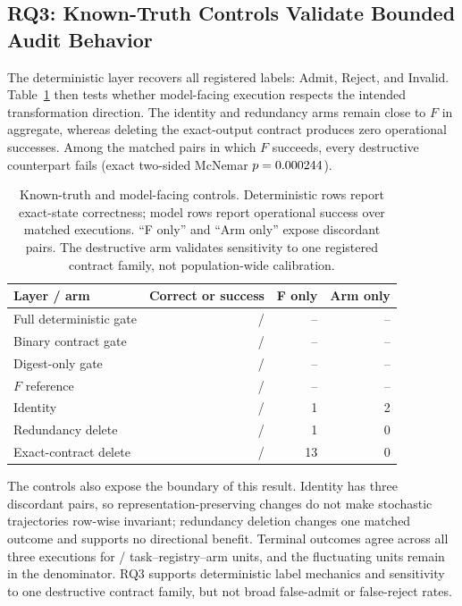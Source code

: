 \subsection{RQ3: Known-Truth Controls Validate Bounded Audit Behavior}

The deterministic layer recovers all \ControlDeterministicCells{} registered labels: \ControlAdmitTruth{} Admit, \ControlRejectTruth{} Reject, and \ControlInvalidTruth{} Invalid. Table~\ref{tab:controls-main} then tests whether model-facing execution respects the intended transformation direction. The identity and redundancy arms remain close to $F$ in aggregate, whereas deleting the exact-output contract produces zero operational successes. Among the \ControlFSuccess{} matched pairs in which $F$ succeeds, every destructive counterpart fails (exact two-sided McNemar $p=0.000244{}$).

\begin{table}[t]
\centering
\footnotesize
\setlength{\tabcolsep}{3pt}
\begin{tabular}{lrrr}
\toprule
Layer / arm & Correct or success & F only & Arm only \\
\midrule
Full deterministic gate & \AblationFullGateCorrect{}/\AblationTotalFixtures{} & -- & -- \\
Binary contract gate & \AblationBinaryContractCorrect{}/\AblationTotalFixtures{} & -- & -- \\
Digest-only gate & \AblationDigestOnlyCorrect{}/\AblationTotalFixtures{} & -- & -- \\
\midrule
$F$ reference & \ControlFSuccess{}/\ControlRowsPerArm{} & -- & -- \\
Identity & \ControlIdentitySuccess{}/\ControlRowsPerArm{} & 1 & 2 \\
Redundancy delete & \ControlRedundancySuccess{}/\ControlRowsPerArm{} & 1 & 0 \\
Exact-contract delete & \ControlNegativeSuccess{}/\ControlRowsPerArm{} & 13 & 0 \\
\bottomrule
\end{tabular}
\caption{Known-truth and model-facing controls. Deterministic rows report exact-state correctness; model rows report operational success over matched executions. ``F only'' and ``Arm only'' expose discordant pairs. The destructive arm validates sensitivity to one registered contract family, not population-wide calibration.}
\label{tab:controls-main}
\end{table}

The controls also expose the boundary of this result. Identity has three discordant pairs, so representation-preserving changes do not make stochastic trajectories row-wise invariant; redundancy deletion changes one matched outcome and supports no directional benefit. Terminal outcomes agree across all three executions for \ControlStableUnits{}/\ControlTotalUnits{} task--registry--arm units, and the fluctuating units remain in the denominator. RQ3 supports deterministic label mechanics and sensitivity to one destructive contract family, but not broad false-admit or false-reject rates.

